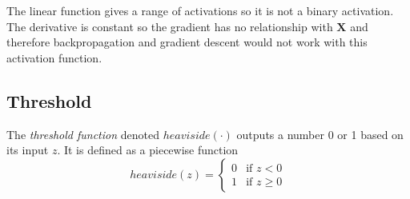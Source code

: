 \documentclass[12pt]{article}
\begin{document}

        The linear function gives a range of activations so it is not a binary activation. The derivative is
        constant so the gradient has no relationship with $\boldsymbol{X}$ and therefore backpropagation and gradient
        descent would not work with this activation function.

    \subsection{Threshold} \label{sec:Threshold}
        The \textit{threshold function} denoted $heaviside(\cdot)$ outputs a number 0 or 1 based on its input $z$. It is defined as a piecewise function
        \[
            heaviside(z) = 
            \begin{cases}
                0 & \text{if $z < 0$} \\
                1 & \text{if $z \geq 0$}
            \end{cases}
        \]

\end{document}
